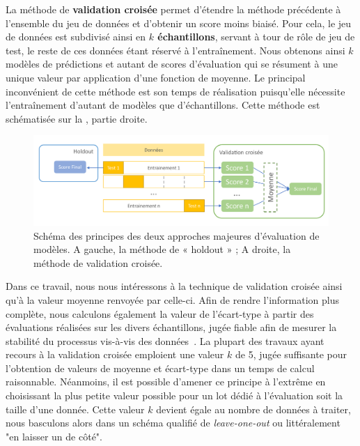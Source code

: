 La méthode de \textbf{validation croisée} permet d'étendre la méthode précédente à l'ensemble du jeu de données et d'obtenir un score moins biaisé. Pour cela, le jeu de données est subdivisé ainsi en \textbf{$k$ échantillons}, servant à tour de rôle de jeu de test, le reste de ces données étant réservé à l'entraînement. Nous obtenons ainsi $k$ modèles de prédictions et autant de scores d'évaluation qui se résument à une unique valeur par application d'une fonction de moyenne. Le principal inconvénient de cette méthode est son temps de réalisation puisqu'elle nécessite l'entraînement d'autant de modèles que d'échantillons. Cette méthode est schématisée sur la , partie droite.\par

\begin{figure}[H]
    \centering
    \includegraphics[width=\textwidth]{contents/chapter_3/resources/scheme_holdout_cv.pdf}
    \caption{Schéma des principes des deux approches majeures d'évaluation de modèles. A gauche, la méthode de « holdout » ; A droite, la méthode de validation croisée.}
    \label{fig:scheme_holdout_cv}
\end{figure}

Dans ce travail, nous nous intéressons à la technique de validation croisée ainsi qu'à la valeur moyenne renvoyée par celle-ci. Afin de rendre l'information plus complète, nous calculons également la valeur de l'écart-type à partir des évaluations réalisées sur les divers échantillons, jugée fiable afin de mesurer la stabilité du processus vis-à-vis des données~\cite{Kim2009}. La plupart des travaux ayant recours à la validation croisée emploient une valeur $k$ de 5, jugée suffisante pour l'obtention de valeurs de moyenne et écart-type dans un temps de calcul raisonnable. Néanmoins, il est possible d'amener ce principe à l'extrême en choisissant la plus petite valeur possible pour un lot dédié à l'évaluation soit la taille d'une donnée. Cette valeur $k$ devient égale au nombre de données à traiter, nous basculons alors dans un schéma qualifié de \textit{leave-one-out} ou littéralement "en laisser un de côté".\par

